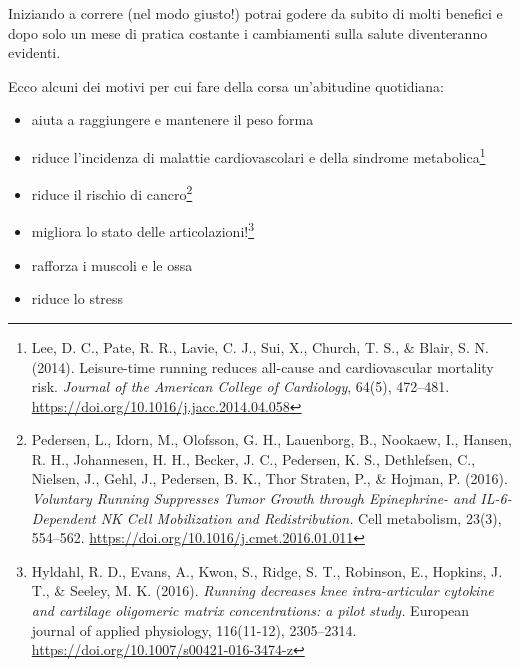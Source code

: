Iniziando a correre (nel modo giusto!) potrai godere da subito di molti
benefici e dopo solo un mese di pratica costante i cambiamenti sulla
salute diventeranno evidenti.

Ecco alcuni dei motivi per cui fare della corsa un'abitudine quotidiana:


\begin{itemize}
    \item aiuta a raggiungere e mantenere il peso forma
    \item riduce l'incidenza di malattie cardiovascolari e della sindrome metabolica\footnote{
        Lee, D. C., Pate, R. R., Lavie, C. J., Sui, X., Church, T. S., \& Blair, S. N. (2014).
        Leisure-time running reduces all-cause and cardiovascular mortality risk.
        \emph{Journal of the American College of Cardiology}, 64(5), 472–481. 
        \url{https://doi.org/10.1016/j.jacc.2014.04.058}
    }
    \item riduce il rischio di cancro\footnote{
        Pedersen, L., Idorn, M., Olofsson, G. H., Lauenborg, B., Nookaew, I.,
        Hansen, R. H., Johannesen, H. H., Becker, J. C., Pedersen, K. S.,
        Dethlefsen, C., Nielsen, J., Gehl, J., Pedersen, B. K., Thor Straten, P., 
        \& Hojman, P. (2016).
        \emph{Voluntary Running Suppresses Tumor Growth through 
        Epinephrine- and IL-6-Dependent NK Cell Mobilization and Redistribution.}
        Cell metabolism, 23(3), 554–562.
        \url{https://doi.org/10.1016/j.cmet.2016.01.011}
    }
    \item migliora lo stato delle articolazioni!\footnote{
        Hyldahl, R. D., Evans, A., Kwon, S., Ridge, S. T., Robinson, E., Hopkins,
        J. T., \& Seeley, M. K. (2016).
        \emph{Running decreases knee intra-articular cytokine and cartilage
        oligomeric matrix concentrations: a pilot study.}
        European journal of applied physiology, 116(11-12), 2305–2314.
        \url{https://doi.org/10.1007/s00421-016-3474-z}
    }
    \item rafforza i muscoli e le ossa
    \item riduce lo stress

\end{itemize}
